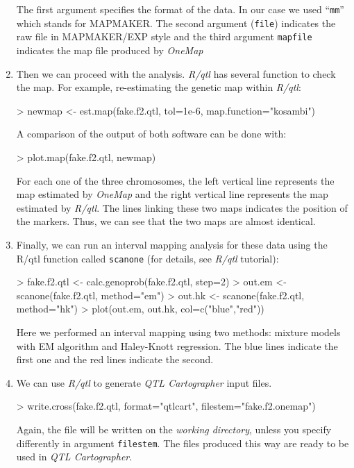 \documentclass[letterpaper,12pt,oneside]{article}
\begin{document}
\begin{enumerate}
The first argument specifies the format of the data. In our case we used ``{\tt mm}'' which stands for MAPMAKER. The second argument ({\tt file}) indicates the raw file in MAPMAKER/EXP style and the third argument {\tt mapfile} indicates the map file produced by {\sl OneMap}

\item Then we can proceed with the analysis. {\sl R/qtl} has several function to check the map. For example, re-estimating the genetic map within {\sl R/qtl}: 
\begin{Schunk}
\begin{Sinput}
> newmap <- est.map(fake.f2.qtl, tol=1e-6, map.function="kosambi")
\end{Sinput}
\end{Schunk}

A comparison of the output of both software can be done with: 

\begin{Schunk}
\begin{Sinput}
> plot.map(fake.f2.qtl, newmap)
\end{Sinput}
\end{Schunk}

For each one of the three chromosomes, the left vertical line represents the map estimated by {\sl OneMap} and the right vertical line represents the map estimated by {\sl R/qtl}. The lines linking these two maps indicates the position of the markers. Thus, we can see that the two maps are almost identical.

\item Finally, we can run an interval mapping analysis for these data using the {R/qtl} function called {\tt scanone} (for details, see {\sl R/qtl} tutorial):

\begin{Schunk}
\begin{Sinput}
> fake.f2.qtl <- calc.genoprob(fake.f2.qtl, step=2)
> out.em <- scanone(fake.f2.qtl, method="em")
> out.hk <- scanone(fake.f2.qtl, method="hk")
> plot(out.em, out.hk, col=c("blue","red"))
\end{Sinput}
\end{Schunk}

Here we performed an interval mapping using two methods: mixture models with EM algorithm and Haley-Knott regression. The blue lines indicate the first one and the red lines indicate the second. 

\item We can use {\sl R/qtl} to generate {\sl QTL Cartographer} input files.
  
\begin{Schunk}
\begin{Sinput}
> write.cross(fake.f2.qtl, format="qtlcart", filestem="fake.f2.onemap")
\end{Sinput}
\end{Schunk}

Again, the file will be written on the {\it working directory}, unless you specify differently in argument {\tt filestem}. The files produced this way are ready to be used in {\sl QTL Cartographer}.

\end{enumerate}
\end{document}
